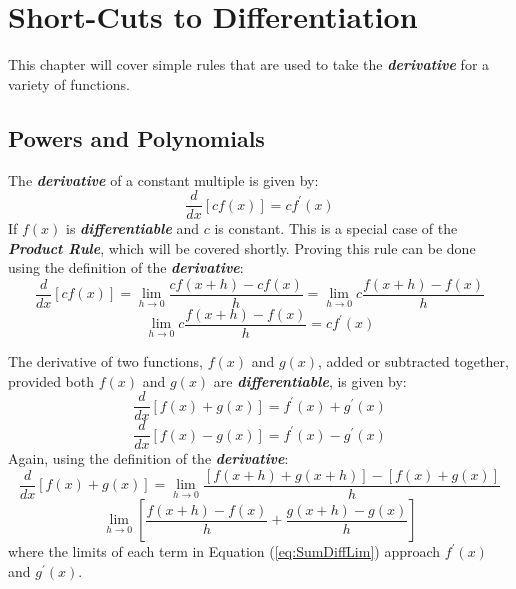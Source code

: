 \chapter{Short-Cuts to Differentiation}
This chapter will cover simple rules that are used to take the \textbf{\textit{derivative}} for a variety of functions.

\section{Powers and Polynomials}
The \textbf{\textit{derivative}} of a constant multiple is given by:
\begin{equation}
\label{eq:ConstantMultDeriv}
\frac{d}{dx}\left[c f(x)\right] = c f^\prime(x)
\end{equation}
%
If $f(x)$ is \textbf{\textit{differentiable}} and $c$ is constant. This is a special case of the \textbf{\textit{Product Rule}}, which will be covered shortly. Proving this rule can be done using the definition of the \textbf{\textit{derivative}}:
\begin{equation}
\frac{d}{dx}\left[c f(x)\right] = \lim_{h \rightarrow 0} \frac{c f(x+h) - cf(x)}{h} = \lim_{h \rightarrow 0} c\frac{f(x+h) - f(x)}{h}
\end{equation}
%
\begin{equation}
\lim_{h \rightarrow 0} c\frac{f(x+h) - f(x)}{h} = c f^\prime(x)
\end{equation}

\vspace{0.1in}
The derivative of two functions, $f(x)$ and $g(x)$, added or subtracted together, provided both $f(x)$ and $g(x)$ are \textbf{\textit{differentiable}}, is given by:
%
\begin{equation}
\label{eq:SumDeriv}
\frac{d}{dx}\left[f(x) + g(x)\right] = f^\prime(x) + g^\prime(x)
\end{equation}
%
\begin{equation}
\label{eq:DiffDeriv}
\frac{d}{dx}\left[f(x) - g(x)\right] = f^\prime(x) - g^\prime(x)
\end{equation}
%
Again, using the definition of the \textbf{\textit{derivative}}:
\begin{equation}
\frac{d}{dx}\left[f(x) + g(x)\right] = \lim_{h \rightarrow 0} \frac{\left[f(x+h) + g(x+h)\right] - \left[f(x) + g(x)\right]}{h}
\end{equation}
%
\begin{equation}
\label{eq:SumDiffLim}
\lim_{h \rightarrow 0} \left[\frac{f(x+h) - f(x)}{h} + \frac{g(x+h) - g(x)}{h}\right]
\end{equation}
%
where the limits of each term in Equation (\ref{eq:SumDiffLim}) approach $f^\prime(x)$ and $g^\prime(x)$.

